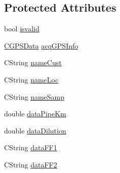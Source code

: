 \subsection*{Protected Attributes}
\begin{DoxyCompactItemize}
\item 
bool \hyperlink{classCCustomerInfoData_ac67f5590832bae201ffd0f14c86357e9}{isvalid}
\item 
\hyperlink{classCGPSData}{CGPSData} \hyperlink{classCCustomerInfoData_a71d4d204d1ef10c635d3dd665d2ca5e6}{acqGPSInfo}
\item 
CString \hyperlink{classCCustomerInfoData_ad389acb7e9b5714d258ffe1211cbeee9}{nameCust}
\item 
CString \hyperlink{classCCustomerInfoData_aa91d2e5c7291f408f465f5161ef24b73}{nameLoc}
\item 
CString \hyperlink{classCCustomerInfoData_a7163a983b6e3c632dd80159577f6d1a3}{nameSamp}
\item 
double \hyperlink{classCCustomerInfoData_afdae97342e110dc8d7fd4ba906692d71}{dataPipeKm}
\item 
double \hyperlink{classCCustomerInfoData_a3eefa5f913ee8837d5fd5606445f4099}{dataDilution}
\item 
CString \hyperlink{classCCustomerInfoData_a61c1265f1a795e38f6a40235ceb49278}{dataFF1}
\item 
CString \hyperlink{classCCustomerInfoData_a71c5c553315fdde41f961a83a5503cdc}{dataFF2}
\end{DoxyCompactItemize}



